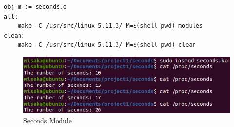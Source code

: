 \documentclass[UTF8,10pt,a4paper]{article}
\theoremstyle{Problem}
\theoremstyle{Solution}
\begin{document}
\begin{lstlisting}
obj-m := seconds.o
all:
	make -C /usr/src/linux-5.11.3/ M=$(shell pwd) modules
clean:
	make -C /usr/src/linux-5.11.3/ M=$(shell pwd) clean
\end{lstlisting}

\begin{figure}[H]
    \centering
    \includegraphics[width=380pt]{sec.png}
    \caption{Seconds Module}
    \label{722ds3}
\end{figure}
\end{document}

